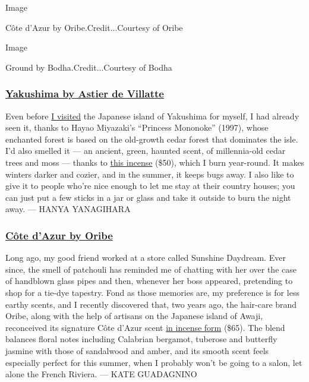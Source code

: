 Image

Côte d'Azur by Oribe.Credit...Courtesy of Oribe

Image

Ground by Bodha.Credit...Courtesy of Bodha

\hypertarget{yakushima-by-astier-de-villatte}{%
\subsubsection{\texorpdfstring{\textbf{\href{https://www.johnderian.com/products/yakushima-incense}{Yakushima
by Astier de
Villatte}}}{Yakushima by Astier de Villatte}}\label{yakushima-by-astier-de-villatte}}

Even before
\href{https://www.nytimes3xbfgragh.onion/2018/05/17/t-magazine/yakushima-japan-hayao-miyazaki-princess-mononoke.html}{I
visited} the Japanese island of Yakushima for myself, I had already seen
it, thanks to Hayao Miyazaki's ``Princess Mononoke'' (1997), whose
enchanted forest is based on the old-growth cedar forest that dominates
the isle. I'd also smelled it --- an ancient, green, haunted scent, of
millennia-old cedar trees and moss --- thanks to
\href{https://www.johnderian.com/products/yakushima-incense}{this
incense} (\$50), which I burn year-round. It makes winters darker and
cozier, and in the summer, it keeps bugs away. I also like to give it to
people who're nice enough to let me stay at their country houses; you
can just put a few sticks in a jar or glass and take it outside to burn
the night away. --- HANYA YANAGIHARA

\hypertarget{cuxf4te-dazur-by-oribe}{%
\subsubsection{\texorpdfstring{\textbf{\href{https://www.oribe.com/oribestorefront/oribe/en/Shop-All/Body-\%26-Fragrance/C\%C3\%B4te-d\%27Azur-Incense/p/400623}{Côte
d'Azur by Oribe}}}{Côte d'Azur by Oribe}}\label{cuxf4te-dazur-by-oribe}}

Long ago, my good friend worked at a store called Sunshine Daydream.
Ever since, the smell of patchouli has reminded me of chatting with her
over the case of handblown glass pipes and then, whenever her boss
appeared, pretending to shop for a tie-dye tapestry. Fond as those
memories are, my preference is for less earthy scents, and I recently
discovered that, two years ago, the hair-care brand Oribe, along with
the help of artisans on the Japanese island of Awaji, reconceived its
signature Côte d'Azur scent
\href{https://www.oribe.com/oribestorefront/oribe/en/Shop-All/Body-\%26-Fragrance/C\%C3\%B4te-d\%27Azur-Incense/p/400623}{in
incense form} (\$65). The blend balances floral notes including
Calabrian bergamot, tuberose and butterfly jasmine with those of
sandalwood and amber, and its smooth scent feels especially perfect for
this summer, when I probably won't be going to a salon, let alone the
French Riviera. --- KATE GUADAGNINO

